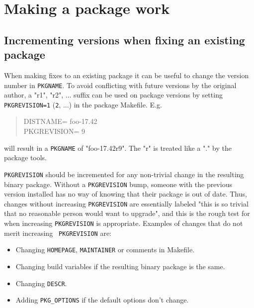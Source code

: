 %
%
%
%
%

\section{Making a package work} %
\label{section:fixing}

\subsection{Incrementing versions when fixing an existing package} %
\label{section:fixing:PKGREVISION}

When making fixes to an existing package it can be useful to change the version
number in {\tt PKGNAME}. To avoid conflicting with future versions by the
original author, a "r1", "r2", ... suffix can be used on package versions by
setting {\tt PKGREVISION=1} ({\tt 2}, ...) in the package Makefile. E.g.
\begin{quote}
   DISTNAME=             foo-17.42\\
   PKGREVISION=          9
\end{quote}
will result in a {\tt PKGNAME} of "foo-17.42r9". The "r" is treated like a "."
by the package tools.

{\tt PKGREVISION} should be incremented for any non-trivial change in the
resulting binary package. Without a {\tt PKGREVISION} bump, someone with the
previous version installed has no way of knowing that their package is out
of date. Thus, changes without increasing {\tt PKGREVISION} are essentially
labeled "this is so trivial that no reasonable person would want to
upgrade", and this is the rough test for when increasing {\tt PKGREVISION}
is appropriate. Examples of changes that do not merit increasing {\tt
PKGREVISION} are:
\begin{itemize}
   \item Changing {\tt HOMEPAGE}, {\tt MAINTAINER} or comments in Makefile.
   \item Changing build variables if the resulting binary package is the same.
   \item Changing {\tt DESCR}.
   \item Adding {\tt PKG\_OPTIONS} if the default options don't change.
\end{itemize}

